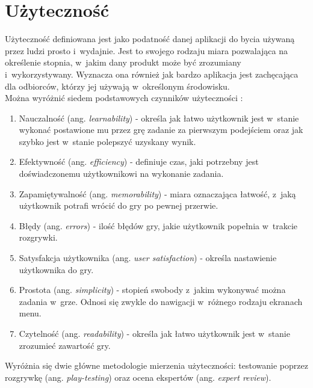 \documentclass[a4paper,12pt,numbers=noenddot]{report}
\begin{document}
\section{Użyteczność}
Użyteczność definiowana jest jako podatność danej aplikacji do bycia używaną przez ludzi prosto i~wydajnie\cite{art_Usability}. Jest to swojego rodzaju miara pozwalająca na określenie stopnia, w~jakim dany produkt może być zrozumiany i~wykorzystywany. Wyznacza ona również jak bardzo aplikacja jest zachęcająca dla odbiorców, którzy jej używają w~określonym środowisku\cite{art_evaluationOfMGevaluationSystem}.
\\
Można wyróżnić siedem podstawowych czynników użyteczności \cite{book_DontMakeMeThink}\cite{art_UsabilityEvaluationSystematicReview}:
\begin{enumerate}
\item Nauczalność (ang. \textit{learnability}) - określa jak łatwo użytkownik jest w~stanie wykonać postawione mu przez grę zadanie za pierwszym podejściem oraz jak szybko jest w~stanie polepszyć uzyskany wynik.
\item Efektywność (ang. \textit{efficiency}) - definiuje czas, jaki potrzebny jest doświadczonemu użytkownikowi na wykonanie zadania.
\item Zapamiętywalność (ang. \textit{memorability}) - miara oznaczająca łatwość, z~jaką użytkownik potrafi wrócić do gry po pewnej przerwie.
\item Błędy (ang. \textit{errors}) - ilość błędów gry, jakie użytkownik popełnia w~trakcie rozgrywki.
\item Satysfakcja użytkownika (ang. \textit{user satisfaction}) - określa nastawienie użytkownika do gry.
\item Prostota (ang. \textit{simplicity}) - stopień swobody z~jakim wykonywać można zadania w~grze. Odnosi się zwykle do nawigacji w~różnego rodzaju ekranach menu.
\item Czytelność (ang. \textit{readability}) - określa jak łatwo użytkownik jest w~stanie zrozumieć zawartość gry.
\end{enumerate}

Wyróżnia się dwie główne metodologie mierzenia użyteczności: testowanie poprzez rozgrywkę (ang. \textit{play-testing}) oraz ocena ekspertów (ang. \textit{expert review}).
\end{document}
